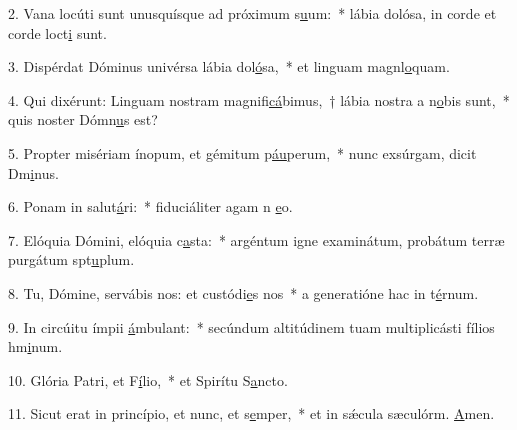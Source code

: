 2. Vana locúti sunt unusquísque ad próximum s\uline{u}um:~* lábia dolósa, in corde et corde loct\uline{i} sunt.\par 
3. Dispérdat Dóminus univérsa lábia dol\uline{ó}sa,~* et linguam magnl\uline{o}quam.\par 
4. Qui dixérunt: Linguam nostram magnifi\uline{cá}bimus,~† lábia nostra a n\uline{o}bis sunt,~* quis noster Dómn\uline{u}s est?\par 
5. Propter misériam ínopum, et gémitum p\uline{áu}perum,~* nunc exsúrgam, dicit Dm\uline{i}nus.\par 
6. Ponam in salut\uline{á}ri:~* fiduciáliter agam n \uline{e}o.\par 
7. Elóquia Dómini, elóquia c\uline{a}sta:~* argéntum igne examinátum, probátum terræ purgátum spt\uline{u}plum.\par 
8. Tu, Dómine, servábis nos: et custódi\uline{e}s nos~* a generatióne hac in t\uline{é}rnum.\par 
9. In circúitu ímpii \uline{á}mbulant:~* secúndum altitúdinem tuam multiplicásti fílios hm\uline{i}num.\par 
10. Glória Patri, et F\uline{í}lio,~* et Spirítu S\uline{a}ncto.\par 
11. Sicut erat in princípio, et nunc, et s\uline{e}mper,~* et in sǽcula sæculórm. \uline{A}men.\par 
